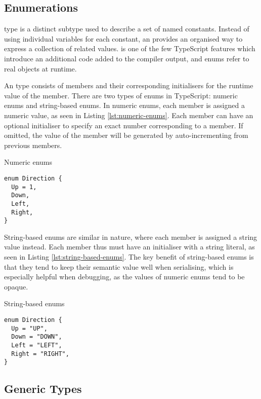 \subsection{Enumerations}

 type is a distinct subtype used to describe a set of named constants. Instead of using individual variables for each constant, an  provides an organised way to express a collection of related values.  is one of the few TypeScript features which introduce an additional code added to the compiler output, and enums refer to real objects at runtime.

An  type consists of members and their corresponding initialisers for the runtime value of the member. There are two types of enums in TypeScript: numeric enums and string-based enums. In numeric enums, each member is assigned a numeric value, as seen in Listing \ref{lst:numeric-enums}. Each member can have an optional initialiser to specify an exact number corresponding to a member. If omitted, the value of the member will be generated by auto-incrementing from previous members.

\begin{listing}[ht]
  \caption{Numeric enums}\label{lst:numeric-enums}
  \begin{verbatim}
enum Direction {
  Up = 1,
  Down,
  Left,
  Right,
}
\end{verbatim}
\end{listing}

String-based enums are similar in nature, where each member is assigned a string value instead. Each member thus must have an initialiser with a string literal, as seen in Listing \ref{lst:string-based-enums}. The key benefit of string-based enums is that they tend to keep their semantic value well when serialising, which is especially helpful when debugging, as the values of numeric enums tend to be opaque.

\begin{listing}[ht]
  \caption{String-based enums}\label{lst:string-based-enums}
  \begin{verbatim}
enum Direction {
  Up = "UP",
  Down = "DOWN",
  Left = "LEFT",
  Right = "RIGHT",
}
\end{verbatim}
\end{listing}

\subsection{Generic Types}

